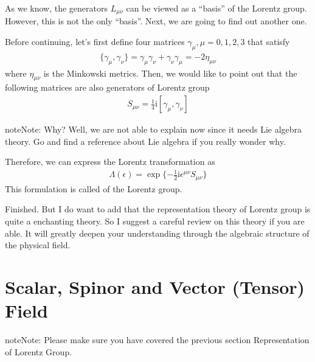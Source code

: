 \documentclass[letterpaper,10pt,english]{sphinxmanual}
\begin{document}
As we know, the generators \(L_{\mu\nu}\) can be viewed as a ``basis'' of the Lorentz group. However, this is not the only ``basis''. Next, we are going to find out another one.

Before continuing, let's first define four matrices \(\gamma_\mu, \mu=0,1,2,3\) that satisfy
\begin{equation*}
\begin{split}\{\gamma_\mu, \gamma_\nu\} = \gamma_\mu\gamma_\nu + \gamma_\nu\gamma_\mu = -2\eta_{\mu\nu}\end{split}
\end{equation*}
where \(\eta_{\mu\nu}\) is the Minkowski metrics. Then, we would like to point out that the following matrices are also generators of Lorentz group
\begin{equation*}
\begin{split}S_{\mu\nu} = \frac{1}{4}\mathrm{i}[\gamma_\mu, \gamma_\nu]\end{split}
\end{equation*}
\begin{sphinxadmonition}{note}{Note:}
Why? Well, we are not able to explain now since it needs Lie algebra theory. Go and find a reference about Lie algebra if you really wonder why.
\end{sphinxadmonition}

Therefore, we can express the Lorentz transformation as
\begin{equation*}
\begin{split}\varLambda(\epsilon) = \exp\{-\frac{1}{2}\mathrm{i}\epsilon^{\mu\nu}S_{\mu\nu}\}\end{split}
\end{equation*}
This formulation is called  of the Lorentz group.

Finished. But I do want to add that the representation theory of Lorentz group is quite a enchanting theory. So I suggest a careful review on this theory if you are able. It will greatly deepen your understanding through the algebraic structure of the physical field.


\section{Scalar, Spinor and Vector (Tensor) Field}
\label{\detokenize{field:scalar-spinor-and-vector-tensor-field}}\label{\detokenize{field::doc}}
\begin{sphinxadmonition}{note}{Note:}
Please make sure you have covered the previous section Representation of Lorentz Group.
\end{sphinxadmonition}
\end{document}
